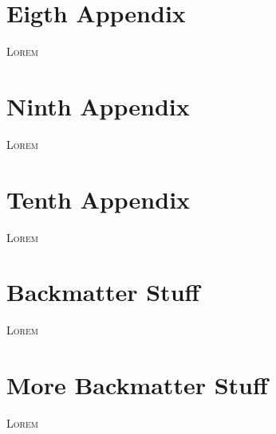 \documentclass[a4paper,oneside,11pt]{memoir}
\begin{document}
\chapter{Eigth Appendix}
\lettrine{\textcolor[gray]{0.5}{L}}{orem} \lipsum[1-2]

\chapter{Ninth Appendix}
\lettrine{\textcolor[gray]{0.5}{L}}{orem} \lipsum[1-2]

\chapter{Tenth Appendix}
\lettrine{\textcolor[gray]{0.5}{L}}{orem} \lipsum[1-2]

\backmatter
\chapter{Backmatter Stuff}
\lettrine{\textcolor[gray]{0.5}{L}}{orem} \lipsum[1-2]

\chapter{More Backmatter Stuff}
\lettrine{\textcolor[gray]{0.5}{L}}{orem} \lipsum[1-2]
\end{document}
